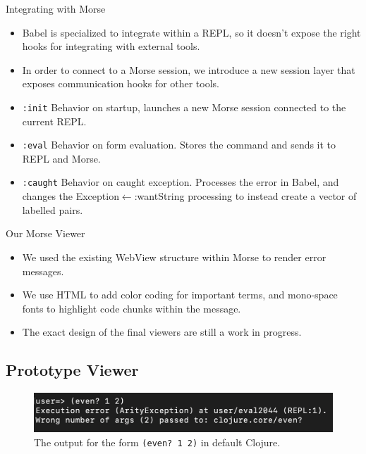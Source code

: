 \documentclass{beamer}
\begin{document}
\begin{frame}{Integrating with Morse}
  \begin{itemize}
    \item<1-> Babel is specialized to integrate within a REPL, so it doesn't expose the right hooks for integrating with external tools.
    \item<2-> In order to connect to a Morse session, we introduce a new session layer that exposes communication hooks for other tools.
    \item<3-> \texttt{:init} Behavior on startup, launches a new Morse session connected to the current REPL.
    \item<4-> \texttt{:eval} Behavior on form evaluation. Stores the command and sends it to REPL and Morse.
    \item<5-> \texttt{:caught} Behavior on caught exception. Processes the error in Babel, and changes the Exception$\leftarrow$:wantString processing to instead create a vector of labelled pairs.  
  \end{itemize}
\end{frame}

\begin{frame}{Our Morse Viewer}
  \begin{itemize}
  \item<1-> We used the existing WebView structure within Morse to render error messages.
  \item<2-> We use HTML to add color coding for important terms, and mono-space fonts to highlight code chunks within the message.
  \item<3-> The exact design of the final viewers are still a work in progress.
  \end{itemize}
\end{frame}

\subsection{Prototype Viewer}
\begin{frame}
  \begin{figure}
    \centering
    \includegraphics[width=\textwidth]{../resources/CljDefaultEven.png}
    \caption{The output for the form \texttt{(even?~1~2)} in default Clojure. }
    \label{fig:defaultclj}
  \end{figure}
\end{frame}
\end{document}
